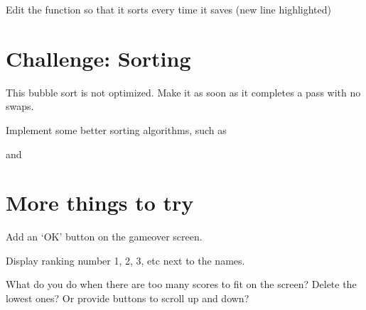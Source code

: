 \documentclass[a4paper,12pt,english]{sphinxmanual}
\begin{document}
\sphinxAtStartPar
Edit the  function so that it sorts every time it saves
(new line highlighted)

\begin{sphinxVerbatim}[commandchars=\\\{\}]
 
       
     
\end{sphinxVerbatim}


\section{Challenge: Sorting}
\label{\detokenize{tutorial:challenge-sorting}}
\sphinxAtStartPar
This bubble sort is not optimized. Make it  as soon as it
completes a pass with no swaps.

\sphinxAtStartPar
Implement some better sorting algorithms, such as %
\begin{footnote}[4]\sphinxAtStartFootnote
{}
%
\end{footnote} and %
\begin{footnote}[5]\sphinxAtStartFootnote
{}
%
\end{footnote}


\section{More things to try}
\label{\detokenize{tutorial:more-things-to-try}}
\sphinxAtStartPar
Add an ‘OK’ button on the gameover screen.

\sphinxAtStartPar
Display ranking number 1, 2, 3, etc next to the names.

\sphinxAtStartPar
What do you do when there are too many scores to fit on the screen?
Delete the lowest ones? Or provide buttons to scroll up and down?
\end{document}
